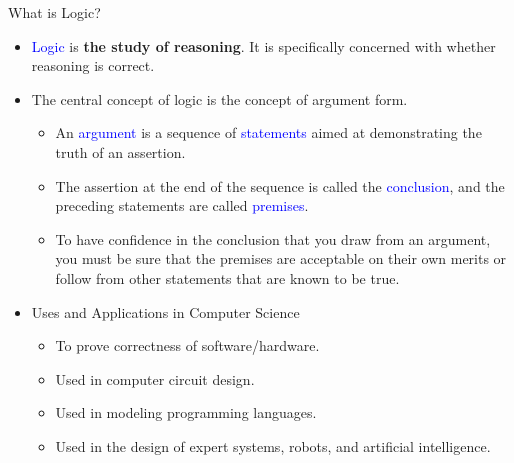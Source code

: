 \documentclass[aspectratio=169]{beamer}
\providecommand{\Blue}[1]{\textcolor{blue}{#1}}
\begin{document}
\begin{frame}[plain]{What is Logic?}
 
 \begin{itemize}
  \item \Blue{Logic} is {\bf the study of reasoning}.
     It is specifically concerned with whether reasoning is correct.\pause
  \item The central concept of logic is the concept of argument form. 
    \begin{itemize}
    \item An \Blue{argument} is a
    sequence of \Blue{statements} aimed at demonstrating the truth of an assertion. 
    \item The assertion at
   the end of the sequence is called the \Blue{conclusion}, 
   and the preceding statements are called
   \Blue{premises}. 
   \item To have conﬁdence in the conclusion that you draw from an argument, 
   you must be sure that the premises are acceptable on their own merits 
   or follow from other statements that are known to be true.
  \end{itemize}\pause
  \item Uses and Applications in Computer Science
    \begin{itemize}
       \item To prove correctness of software/hardware.
       \item Used in computer circuit design.
       \item Used in modeling programming languages.
       \item Used in the design of expert systems, robots, and artificial intelligence.
     \end{itemize}
\end{itemize}

 
\end{frame}
\end{document}
